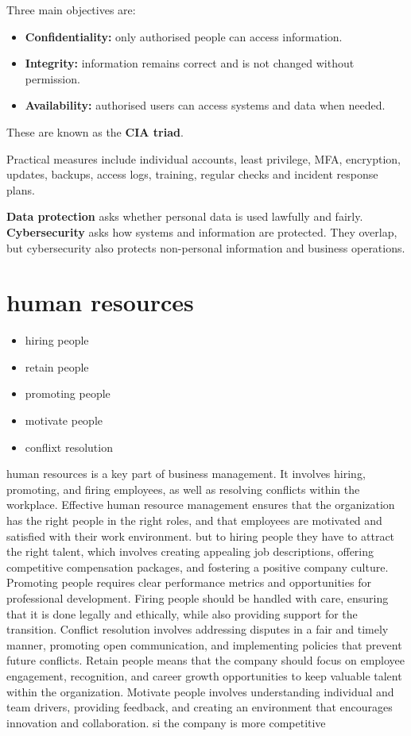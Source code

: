 \documentclass[12pt,a4paper]{report}
\newcommand{\tightlist}{}
\begin{document}
Three main objectives are:

\begin{itemize}
\tightlist
\item
  \textbf{Confidentiality:} only authorised people can access information.
\item
  \textbf{Integrity:} information remains correct and is not changed without permission.
\item
  \textbf{Availability:} authorised users can access systems and data when needed.
\end{itemize}

These are known as the \textbf{CIA triad}.

Practical measures include individual accounts, least privilege, MFA, encryption, updates, backups, access logs, training, regular checks and incident response plans.

\textbf{Data protection} asks whether personal data is used lawfully and fairly. \textbf{Cybersecurity} asks how systems and information are protected. They overlap, but cybersecurity also protects non-personal information and business operations.

\chapter{human resources}
\begin{itemize}
  \item hiring people
  \item retain people
  \item promoting people
  \item motivate people
  \item conflixt resolution
\end{itemize}
human resources is a key part of business management. It involves hiring, promoting, and firing employees, as well as resolving conflicts within the workplace. Effective human resource management ensures that the organization has the right people in the right roles, and that employees are motivated and satisfied with their work environment.
but to hiring people they have to attract the right talent, which involves creating appealing job descriptions, offering competitive compensation packages, and fostering a positive company culture. Promoting people requires clear performance metrics and opportunities for professional development. Firing people should be handled with care, ensuring that it is done legally and ethically, while also providing support for the transition. Conflict resolution involves addressing disputes in a fair and timely manner, promoting open communication, and implementing policies that prevent future conflicts.
Retain people means that the company should focus on employee engagement, recognition, and career growth opportunities to keep valuable talent within the organization. 
Motivate people involves understanding individual and team drivers, providing feedback, and creating an environment that encourages innovation and collaboration. si the company is more competitive
\end{document}
